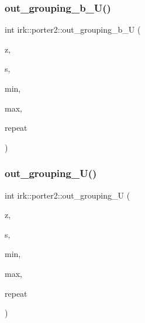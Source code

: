 \mbox{\label{namespaceirk_1_1porter2_a5a28c19f32c794a27ab0672e0a52fe1a}} 
\subsubsection{\texorpdfstring{out\+\_\+grouping\+\_\+b\+\_\+\+U()}{out\_grouping\_b\_U()}}
{\footnotesize\ttfamily int irk\+::porter2\+::out\+\_\+grouping\+\_\+b\+\_\+U (\begin{DoxyParamCaption}\item[{struct \mbox{\hyperlink{structirk_1_1porter2_1_1SN__env}{S\+N\+\_\+env}} $\ast$}]{z,  }\item[{const unsigned char $\ast$}]{s,  }\item[{int}]{min,  }\item[{int}]{max,  }\item[{int}]{repeat }\end{DoxyParamCaption})}

\mbox{\label{namespaceirk_1_1porter2_a1e111b2024901f834ec4965fb4c085cf}} 
\subsubsection{\texorpdfstring{out\+\_\+grouping\+\_\+\+U()}{out\_grouping\_U()}}
{\footnotesize\ttfamily int irk\+::porter2\+::out\+\_\+grouping\+\_\+U (\begin{DoxyParamCaption}\item[{struct \mbox{\hyperlink{structirk_1_1porter2_1_1SN__env}{S\+N\+\_\+env}} $\ast$}]{z,  }\item[{const unsigned char $\ast$}]{s,  }\item[{int}]{min,  }\item[{int}]{max,  }\item[{int}]{repeat }\end{DoxyParamCaption})}

\mbox{\label{namespaceirk_1_1porter2_a81386f566b59d0cbb9461e5bcef84837}} 
